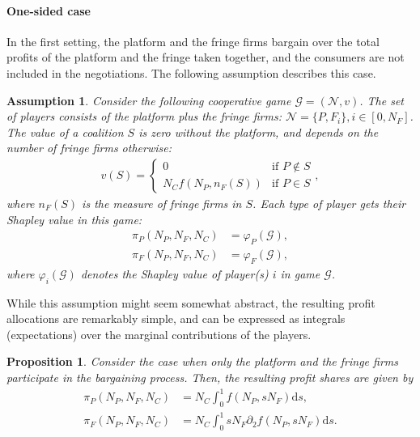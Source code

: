 \documentclass[a4paper]{article}
\newtheorem{proposition}{Proposition}
\newtheorem{assumption}{Assumption}
\newcommand{\ds}{\mathrm{d}s}
\begin{document}
\paragraph{One-sided case} In the first setting, the platform and the fringe firms bargain over the total profits of the platform and the fringe taken together, and the consumers are not included in the negotiations.
The following assumption describes this case.
\begin{assumption}
    \label{ass:profit_sharing}
    Consider the following cooperative game $\mathcal{G} = (\mathcal{N}, v)$.
    The set of players consists of the platform plus the fringe firms: $\mathcal{N} = \{P, F_i\}, i \in [0, N_F]$.
    The value of a coalition $S$ is zero without the platform, and depends on the number of fringe firms otherwise:
    \begin{align*}
        v(S) = \begin{cases}
            0 & \text{if } P \notin S \\
            N_C f(N_P, n_F(S)) & \text{if } P \in S
        \end{cases},
    \end{align*}
    where $n_F(S)$ is the measure of fringe firms in $S$.
    Each type of player gets their Shapley value in this game:
    \begin{align*}
        \pi_P(N_P, N_F, N_C) &= \varphi_P(\mathcal{G}), \\
        \pi_F(N_P, N_F, N_C) &= \varphi_F(\mathcal{G}),
    \end{align*}
    where $\varphi_i(\mathcal{G})$ denotes the Shapley value of player(s) $i$ in game $\mathcal{G}$.
\end{assumption}

While this assumption might seem somewhat abstract, the resulting profit allocations are remarkably simple, and can be expressed as integrals (expectations) over the marginal contributions of the players.
\begin{proposition}
    \label{prop:profit_sharing}
    Consider the case when only the platform and the fringe firms participate in the bargaining process.
    Then, the resulting profit shares are given by
    \begin{align*}
        \pi_P(N_P, N_F, N_C) &= N_C \int_0^1 f(N_P, s N_F) \ds, \\
        \pi_F(N_P, N_F, N_C) &= N_C \int_0^1 s N_F \partial_2 f(N_P, s N_F) \ds.
    \end{align*}
\end{proposition}
\end{document}
